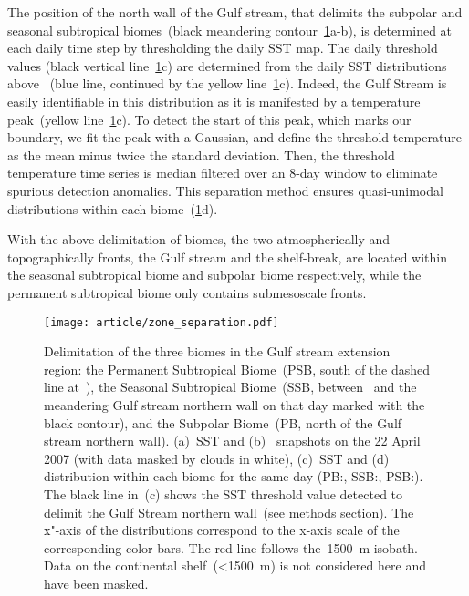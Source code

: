 The position of the north wall of the Gulf stream, that delimits the subpolar and seasonal subtropical biomes~(black meandering contour~\cref{fig:zone-separation}a-b), is determined at each daily time step by thresholding the daily SST map.
The daily threshold values (black vertical line~\cref{fig:zone-separation}c) are determined from the daily SST distributions above ~(blue line, continued by the yellow line~\cref{fig:zone-separation}c).
Indeed, the Gulf Stream is easily identifiable in this distribution as it is manifested by a temperature peak~(yellow line~\cref{fig:zone-separation}c).
To detect the start of this peak, which marks our boundary, we fit the peak with a Gaussian, and define the threshold temperature as the mean minus twice the standard deviation.
Then, the threshold temperature time series is median filtered over an 8-day window to eliminate spurious detection anomalies.
This separation method ensures quasi-unimodal  distributions within each biome~(\cref{fig:zone-separation}d).

With the above delimitation of biomes, the two atmospherically and topographically fronts,  the Gulf stream and the shelf-break, are located within the seasonal subtropical biome and subpolar biome respectively, while the permanent subtropical biome only contains submesoscale fronts.

\begin{figure}
  \centering
  \texttt{[image: article/zone\_separation.pdf]}
  \caption[Delimitation of biomes]{
    Delimitation of the three biomes in the Gulf stream extension region: the Permanent Subtropical Biome~(PSB, south of the dashed line at~), the Seasonal Subtropical Biome~(SSB, between~ and the meandering Gulf stream northern wall on that day marked with the black contour), and the Subpolar Biome~(PB, north of the Gulf stream northern wall).
    (a)~SST and (b)~ snapshots on the 22 April 2007 (with data masked by clouds in white), (c)~SST and (d)~  distribution within each biome for the same day (PB:\@blue, SSB:\@yellow, PSB:\@red).
    The black line in~(c) shows the SST threshold value detected to delimit the Gulf Stream northern wall~(see methods section).
    The x"-axis of the distributions correspond to the x-axis scale of the corresponding color bars.
    The red line follows the~\qty{1500}{m} isobath.
    Data on the continental shelf~(\qty{<1500}{\m}) is not considered here and have been masked.
  }%
  \label{fig:zone-separation}
\end{figure}


